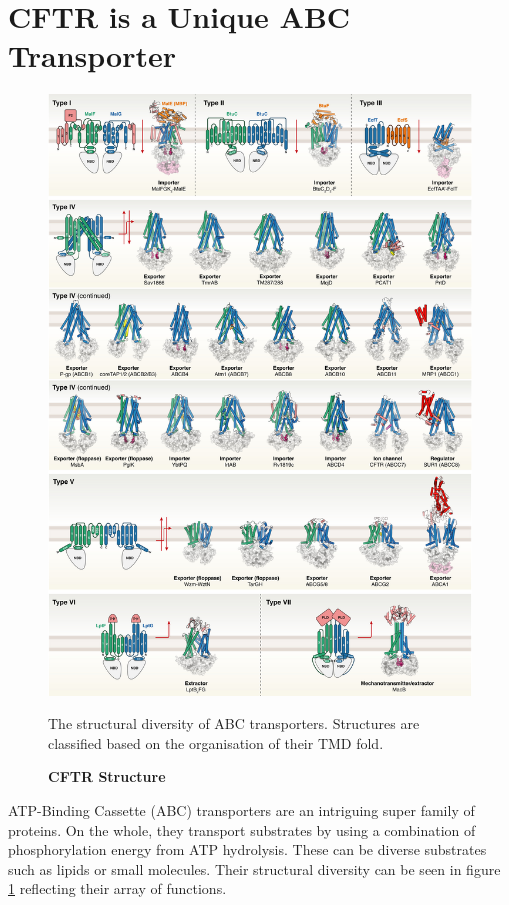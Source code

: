 \section{CFTR is a Unique ABC Transporter}

\begin{figure}
	\label{ABC_diversity}
	\begin{center}
	\includegraphics[width=\textwidth]{figures/ABC_classification.png}
	\end{center}
	\captionsetup{singlelinecheck = false, justification=raggedright}
	\caption[CFTR Structure] {\textbf{CFTR Structure}}{The structural diversity of ABC transporters. Structures are classified based on the organisation of their TMD fold\cite{thomas2020}.} 
\end{figure}
ATP-Binding Cassette (ABC) transporters are an intriguing super family of proteins. On the whole, they transport substrates by using a combination of phosphorylation energy from ATP hydrolysis. These can be diverse substrates such as lipids or small molecules. Their structural diversity can be seen in figure \ref{ABC_diversity} reflecting their array of functions. 

